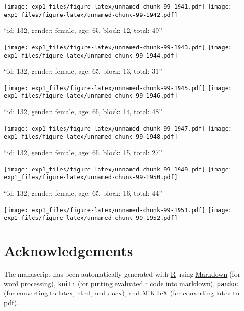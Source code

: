 \documentclass[,]{article}
\begin{document}
\texttt{[image: exp1\_files/figure-latex/unnamed-chunk-99-1941.pdf]}
\texttt{[image: exp1\_files/figure-latex/unnamed-chunk-99-1942.pdf]}

\newpage
[1] 

``id: 132, gender: female, age: 65, block: 12, total: 49''

\texttt{[image: exp1\_files/figure-latex/unnamed-chunk-99-1943.pdf]}
\texttt{[image: exp1\_files/figure-latex/unnamed-chunk-99-1944.pdf]}

\newpage
[1] 

``id: 132, gender: female, age: 65, block: 13, total: 31''

\texttt{[image: exp1\_files/figure-latex/unnamed-chunk-99-1945.pdf]}
\texttt{[image: exp1\_files/figure-latex/unnamed-chunk-99-1946.pdf]}

\newpage
[1] 

``id: 132, gender: female, age: 65, block: 14, total: 48''

\texttt{[image: exp1\_files/figure-latex/unnamed-chunk-99-1947.pdf]}
\texttt{[image: exp1\_files/figure-latex/unnamed-chunk-99-1948.pdf]}

\newpage
[1] 

``id: 132, gender: female, age: 65, block: 15, total: 27''

\texttt{[image: exp1\_files/figure-latex/unnamed-chunk-99-1949.pdf]}
\texttt{[image: exp1\_files/figure-latex/unnamed-chunk-99-1950.pdf]}

\newpage
[1] 

``id: 132, gender: female, age: 65, block: 16, total: 44''

\texttt{[image: exp1\_files/figure-latex/unnamed-chunk-99-1951.pdf]}
\texttt{[image: exp1\_files/figure-latex/unnamed-chunk-99-1952.pdf]}

\newpage

\section{Acknowledgements}\label{acknowledgements}

The manuscript has been automatically generated with
\href{http://r-project.org/}{R} using
\href{http://daringfireball.net/projects/markdown/}{Markdown} (for word
processing), \href{http://yihui.name/knitr/}{\texttt{knitr}} (for
putting evaluated r code into markdown),
\href{http://johnmacfarlane.net/pandoc/}{\texttt{pandoc}} (for
converting to latex, html, and docx), and
\href{http://miktex.org/}{MiKTeX} (for converting latex to pdf).
\end{document}
